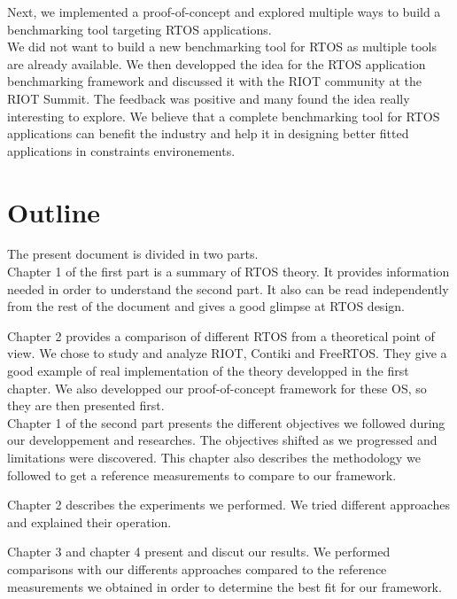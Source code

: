 Next, we implemented a proof-of-concept and explored multiple ways to build a benchmarking tool targeting RTOS applications.\\

We did not want to build a new benchmarking tool for RTOS as multiple tools are already available.
We then developped the idea for the RTOS application benchmarking framework and discussed it with the RIOT community at the RIOT Summit.
The feedback was positive and many found the idea really interesting to explore.
We believe that a complete benchmarking tool for RTOS applications can benefit the industry 
    and help it in designing better fitted applications in constraints environements.
%
%
\section*{Outline}
The present document is divided in two parts.\\

Chapter 1 of the first part is a summary of RTOS theory.
It provides information needed in order to understand the second part.
It also can be read independently from the rest of the document and gives a good glimpse at RTOS design.

Chapter 2 provides a comparison of different RTOS from a theoretical point of view.
We chose to study and analyze RIOT, Contiki and FreeRTOS.
They give a good example of real implementation of the theory developped in the first chapter.
We also developped our proof-of-concept framework for these OS, so they are then presented first.\\

Chapter 1 of the second part presents the different objectives we followed during our developpement and researches.
The objectives shifted as we progressed and limitations were discovered.
This chapter also describes the methodology we followed to get a reference measurements to compare to our framework.

Chapter 2 describes the experiments we performed.
We tried different approaches and explained their operation.

Chapter 3 and chapter 4 present and discut our results.
We performed comparisons with our differents approaches compared to the reference measurements we obtained in order to determine the best fit for our framework.